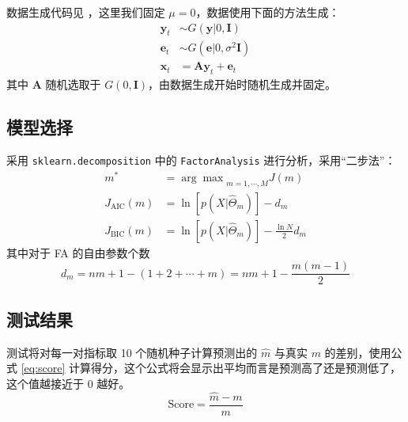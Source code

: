     数据生成代码见 ，这里我们固定 $\mu=0$，数据使用下面的方法生成：
    \begin{align*}
        \mathbf{y}_t&\sim G(\mathbf{y}|0,\mathbf{I})\\
        \mathbf{e}_t&\sim G(\mathbf{e}|0,\sigma^2\mathbf{I})\\
        \mathbf{x}_t&=\mathbf{A}\mathbf{y}_t + \mathbf{e}_t
    \end{align*}
    其中 $\mathbf{A}$ 随机选取于 $G(0,\mathbf{I})$，由数据生成开始时随机生成并固定。

    \subsection{模型选择}

    采用 \verb"sklearn.decomposition" 中的 \verb"FactorAnalysis" 进行分析，采用“二步法”：
    \begin{align*}
        m^* &= {\arg\max}_{m=1,\cdots,M}J(m)\\
        J_\text{AIC}(m) &= \ln\left[p(X|\hat{\Theta}_m)\right] - d_m\\
        J_\text{BIC}(m) &= \ln\left[p(X|\hat{\Theta}_m)\right] - \frac{\ln N}{2}d_m
    \end{align*}
    其中对于 FA 的自由参数个数
    \begin{equation*}
        d_m = nm + 1 - (1+2+\cdots+m) = nm + 1 - \frac{m(m-1)}{2}
    \end{equation*}

    \subsection{测试结果}

    测试将对每一对指标取 10 个随机种子计算预测出的 $\hat{m}$ 与真实 $m$ 的差别，使用公式 \ref{eq:score} 计算得分，这个公式将会显示出平均而言是预测高了还是预测低了，这个值越接近于 0 越好。
    \begin{equation}\label{eq:score}
        \mathrm{Score} = \frac{\hat{m} - m}{m}
    \end{equation}

